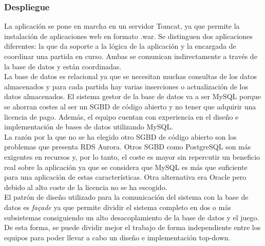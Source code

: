 \subsubsection{Despliegue}
La aplicación se pone en marcha en un servidor Tomcat, ya que permite la instalación de aplicaciones web en formato .war. Se distinguen dos aplicaciones diferentes: la que da soporte a la lógica de la aplicación y la encargada de coordinar una partida en curso. Ambas se comunican indirectamente a través de la base de datos y están coordinadas. \\
La base de datos es relacional ya que se necesitan muchas consultas de los datos almacenados y para cada partida hay varias inserciones o actualización de los datos almacenados. El sistema gestor de la base de datos va a ser MySQL porque se ahorran costes al ser un SGBD de código abierto y no tener que adquirir una licencia de pago. Además, el equipo cuentan con experiencia en el diseño e implementación de bases de datos utilizando MySQL. \\
La razón por la que no se ha elegido otro SGBD de código abierto son los problemas que presenta RDS Aurora. Otros SGBD como PostgreSQL son más exigentes en recursos y, por lo tanto, el coste es mayor sin repercutir un beneficio real sobre la aplicación ya que se considera que MySQL es más que suficiente para una aplicación de estas características.
Otra alternativa era Oracle pero debido al alto coste de la licencia no se ha escogido. \\
El patrón de diseño utilizado para la comunicación del sistema con la base de datos es \textit{façade} ya que permite dividir el sistema completo en dos o más subsistemas consiguiendo un alto desacoplamiento de la base de datos y el juego. De esta forma, se puede dividir mejor el trabajo de forma independiente entre los equipos para poder llevar a cabo un diseño e implementación top-down.


